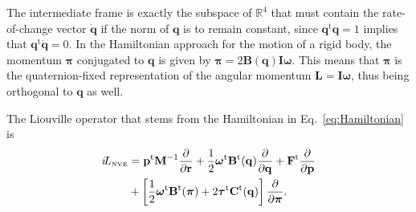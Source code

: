 \documentclass[
journal=jctcce,
layout=twocolumn
]{achemso}
\newcommand{\mt}[1]{\boldsymbol{\mathbf{#1}}}   %
\newcommand{\vt}[1]{\boldsymbol{\mathbf{#1}}}   %
\newcommand{\tr}[1]{#1^\text{t}}                %
\newcommand{\diff}[2]{\frac{\partial #1}{\partial #2}} %
\newcommand{\Liu}[1]{i\!L_\text{#1}}            %
\begin{document}
The intermediate frame is exactly the subspace of $\mathbb{R}^4$ that must contain the rate-of-change vector $\dot{\vt q}$ if the norm of $\vt q$ is to remain constant, since $\tr{\vt q} {\vt q} = 1$ implies that $\tr{\vt q} \dot{\vt q} = 0$. In the Hamiltonian approach for the motion of a rigid body, the momentum $\vt \pi$ conjugated to $\vt q$ is given by $\vt \pi = 2 \mt B(\vt q) \mt I \vt \omega$.\cite{Silveira_2017} This means that $\vt \pi$ is the quaternion-fixed representation of the angular momentum $\vt L = \mt I \vt \omega$, thus being orthogonal to $\vt q$ as well.

The Liouville operator that stems from the Hamiltonian in Eq.~\eqref{eq:Hamiltonian} is\cite{Silveira_2017}
\begin{equation}
\label{eq:Lioville operator}
\begin{split}
\Liu{\tiny NVE} &= \tr{\vt p} {\mt M}^{-1} \diff{}{\vt r} + \frac{1}{2} \tr{\vt \omega} \tr{\mt B}(\vt q) \diff{}{\vt q} + \tr{\vt F} \diff{}{\vt p} \\
&+ \left[ \frac{1}{2} \tr{\vt \omega} \tr{\mt B}(\vt \pi) + 2 \tr{\vt \tau} \tr{\mt C}(\vt q) \right] \diff{}{\vt \pi}.
\end{split}
\end{equation}
\end{document}
